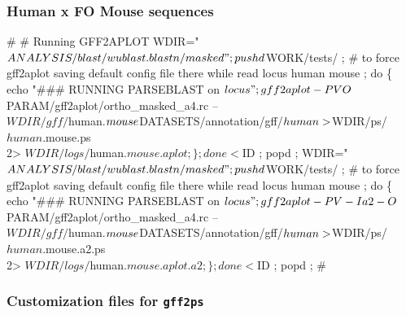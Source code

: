 \documentclass[11pt]{article}
\def\nwendcode{\endtrivlist \endgroup} %
\let\nwdocspar=\par                    %
\newcommand{\subsubsctn}[1]{\subsubsection{#1}}
\def\gps{\texttt{gff2ps}}
\begin{document}
\subsubsctn{Human x FO Mouse sequences}

\nwenddocs{}\plusendmoddef
#
# Running GFF2APLOT
WDIR="$ANALYSIS/blast/wublast.blastn/masked" ;
pushd $WORK/tests/ ; # to force gff2aplot saving default config file there
while read locus human mouse ;
  do \{
    echo "### RUNNING PARSEBLAST on $locus" ;
    gff2aplot -PVO $PARAM/gff2aplot/ortho_masked_a4.rc -- \\
                   $WDIR/gff/$human.$mouse \\
                   $DATASETS/annotation/gff/$human \\
                 > $WDIR/ps/$human.$mouse.ps \\
                2> $WDIR/logs/$human.$mouse.aplot ;
    \} ;
  done < $ID ;
popd ;
WDIR="$ANALYSIS/blast/wublast.blastn/masked" ;
pushd $WORK/tests/ ; # to force gff2aplot saving default config file there
while read locus human mouse ;
  do \{
    echo "### RUNNING PARSEBLAST on $locus" ;
    gff2aplot -PV -I a2 -O $PARAM/gff2aplot/ortho_masked_a4.rc -- \\
                   $WDIR/gff/$human.$mouse \\
                   $DATASETS/annotation/gff/$human \\
                 > $WDIR/ps/$human.$mouse.a2.ps \\
                2> $WDIR/logs/$human.$mouse.aplot.a2 ;
    \} ;
  done < $ID ;
popd ;
#
\nwendcode{}\nwdocspar

\subsubsctn{Customization files for {\gps}}
\end{document}
